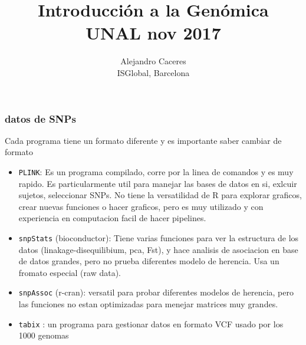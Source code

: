 \documentclass{beamer}\usepackage[]{graphicx}\usepackage[]{color}
\begin{document}
\title{Introducci\'on a la Gen\'omica \\ UNAL nov 2017}
\author{Alejandro Caceres \\ ISGlobal, Barcelona}


\maketitle


\begin{frame}[fragile]
\frametitle{datos de SNPs}
Cada programa tiene un formato diferente y es importante saber cambiar de formato
\begin{itemize}
\item {\tt PLINK}: Es un programa compilado, corre por la linea de comandos y es muy rapido. Es particularmente util para manejar las bases de datos en si, exlcuir sujetos, seleccionar SNPs. No tiene la versatilidad de R para explorar graficos, crear nuevas funciones o hacer graficos, pero es muy utilizado y con experiencia en computacion facil de hacer pipelines.

\item {\tt snpStats} (bioconductor): Tiene varias funciones para ver la estructura de los datos (linakage-disequilibium, pca, Fst), y hace analisis de asociacion en base de datos grandes, pero no prueba diferentes modelo de herencia. Usa un fromato especial (raw data).

\item {\tt snpAssoc} (r-cran): versatil para probar diferentes modelos de herencia, pero las funciones no estan optimizadas para menejar matrices muy grandes. 

\item {\tt tabix} : un programa para gestionar datos en formato VCF usado por los 1000 genomas  
 
\end{itemize}
\end{frame}
\end{document}
